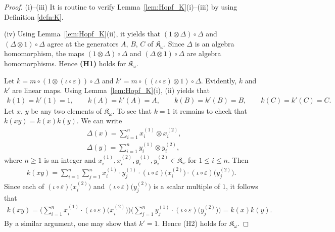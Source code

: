 \documentclass[pdftex]{sigma}%
\def\K{\mathfrak K_\omega}
\def\e{\varepsilon}
\numberwithin{equation}{section}
\begin{document}
\begin{proof}
(i)--(iii) It is routine to verify Lemma~\ref{lem:Hopf_K}(i)--(iii) by using Definition \ref{defn:K}.

(iv) Using Lemma~\ref{lem:Hopf_K}(ii), it yields that $(1\otimes \Delta)\circ \Delta$ and $(\Delta\otimes 1)\circ \Delta$ agree at the generators $A$, $B$, $C$ of $\K$. Since $\Delta$ is an algebra homomorphism, the maps $(1\otimes \Delta)\circ \Delta$ and $(\Delta\otimes 1)\circ \Delta$ are algebra homomorphisms. Hence {\bf (H1)} holds for $\K$.

Let $k=m\circ (1\otimes (\iota\circ \e))\circ \Delta$ and $k'=m\circ ((\iota\circ \e)\otimes 1)\circ \Delta$. Evidently, $k$ and $k'$ are linear maps.
Using Lemma~\ref{lem:Hopf_K}(i), (ii) yields that
\begin{gather*}
k(1)=k'(1)=1,
\qquad
k(A)=k'(A)=A,
\qquad
k(B)=k'(B)=B,
\qquad
k(C)=k'(C)=C.
\end{gather*}
Let $x$, $y$ be any two elements of $\K$.
To see that $k=1$ it remains to check that $k(xy)=k(x)k(y)$. We can write
\begin{align}
&\Delta(x)=\sum_{i=1}^n x_i^{(1)}\otimes x_i^{(2)},
\label{Dx}
\\
&\Delta(y)=\sum_{i=1}^n y_i^{(1)}\otimes y_i^{(2)},
\label{Dy}
\end{align}
where $n\geq 1$ is an integer and $x_i^{(1)},x_i^{(2)},y_i^{(1)},y_i^{(2)}\in \K$ for $1\leq i\leq n$. Then
\begin{gather*}
k(xy)=
\sum_{i=1}^n \sum_{j=1}^n x_i^{(1)}\cdot y_j^{(1)}\cdot (\iota\circ \e)\big(x_i^{(2)}\big)\cdot (\iota\circ \e)\big(y_j^{(2)}\big).
\end{gather*}
Since each of $(\iota\circ \e)\big(x_i^{(2)}\big)$ and $(\iota\circ \e)\big(y_j^{(2)}\big)$ is a scalar multiple of $1$, it follows that
\begin{gather*}
k(xy)=\bigg(\sum_{i=1}^n x_i^{(1)}\cdot (\iota\circ \e)\big(x_i^{(2)}\big)\bigg)
\bigg(\sum_{j=1}^n y_j^{(1)}\cdot (\iota\circ \e)\big(y_j^{(2)}\big)\bigg)=k(x)k(y).
\end{gather*}
By a similar argument, one may show that $k'=1$. Hence (H2) holds for $\K$.


\end{proof}
\end{document}

